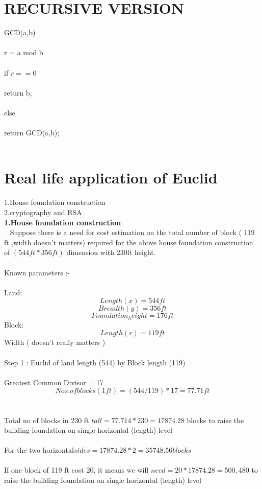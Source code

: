 \documentclass[12pt]{article}
\begin{document}
\section{\textcolor{BurntOrange}{RECURSIVE VERSION}}
\textsf
GCD(a,b) \\\\
r = a mod b \\\\
if $ r == 0 $ \\\\
return b;\\\\
else \\\\
return GCD(a,b);\\\\
\section{\textcolor{BurntOrange}{Real life application of Euclid}}
\textsf
1.House foundation construction \\
2.cryptography and RSA\\

\textbf{1.House foundation construction }\\ ~\cite{2}
Suppose there is a need for cost estimation on 
the total number of block ( 119 ft ,width doesn’t
matters) required for the above house
foundation construction of $ (544 ft * 356 ft) $
dimension with 230ft height.\\\\
Known parameters :-\\\\
Land:\\
$$ Length(x) = 544 ft $$
$$ Breadth (y) = 356 ft $$
$$ Foundation_height = 176ft $$
Block:\\
$$ Length ( r ) = 119ft $$
Width ( doesn’t really matters )\\\\


Step 1 : Euclid of land length (544) by Block length (119)\\\\
Greatest Common Divisor = 17\\
 $$ Nos.of blocks ( 1 ft ) = ( 544 / 119 ) * 17 = 77.71 ft $$\\\\
Total no of blocks in 230 ft $ tall = 77.714 * 230 = 17874.28 $ blocks to raise the building foundation on single horizontal (length) level\\\\
For the two horizontal$ sides = 17874.28 * 2 = 35748.56 blocks $\\\\
If one block of 119 ft cost 20, it means we will $ need = 20 * 17874.28 = 500,480 $ to raise the
building foundation on single horizontal
(length) level \\\\
\end{document}
